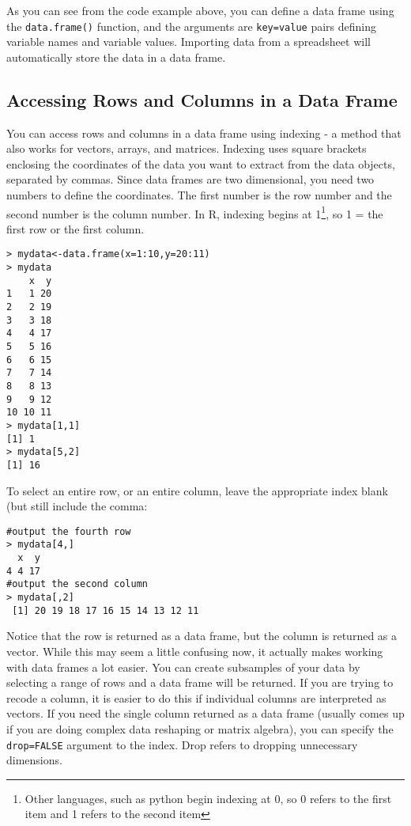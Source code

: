 \documentclass[12pt, oneside]{amsart}   	%
\begin{document}
As you can see from the code example above, you can define a data frame using the \texttt{data.frame()} function, and the arguments are \texttt{key=value} pairs defining variable names and variable values. Importing data from a spreadsheet will automatically store the data in a data frame. 

\subsection{Accessing Rows and Columns in a Data Frame}

You can access rows and columns in a data frame using indexing - a method that also works for vectors, arrays, and matrices. Indexing uses square brackets enclosing the coordinates of the data you want to extract from the data objects, separated by commas. Since data frames are two dimensional, you need two numbers to define the coordinates. The first number is the row number and the second number is the column number. In R, indexing begins at 1\footnote{Other languages, such as python begin indexing at 0, so 0 refers to the first item and 1 refers to the second item}, so 1 = the first row or the first column. 

\begin{verbatim}
> mydata<-data.frame(x=1:10,y=20:11)
> mydata
    x  y
1   1 20
2   2 19
3   3 18
4   4 17
5   5 16
6   6 15
7   7 14
8   8 13
9   9 12
10 10 11
> mydata[1,1]
[1] 1
> mydata[5,2]
[1] 16
\end{verbatim}

To select an entire row, or an entire column, leave the appropriate index blank (but still include the comma:

\begin{verbatim}
#output the fourth row
> mydata[4,]
  x  y
4 4 17
#output the second column
> mydata[,2]
 [1] 20 19 18 17 16 15 14 13 12 11
\end{verbatim}

Notice that the row is returned as a data frame, but the column is returned as a vector. While this may seem a little confusing now, it actually makes working with data frames a lot easier. You can create subsamples of your data by selecting a range of rows and a data frame will be returned. If you are trying to recode a column, it is easier to do this if individual columns are interpreted as vectors. If you need the single column returned as a data frame (usually comes up if you are doing complex data reshaping or matrix algebra), you can specify the \texttt{drop=FALSE} argument to the index. Drop refers to dropping unnecessary dimensions.
\end{document}
